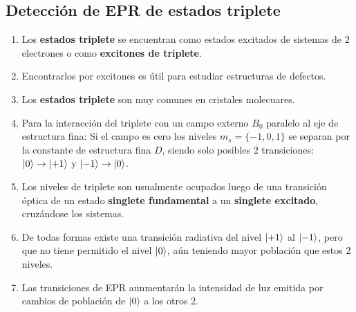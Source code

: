 \documentclass[aps,rmp,reprint,longbibliography]{revtex4-1}
\begin{document}
\subsection{Detección de EPR de estados triplete}
\begin{enumerate}
\item Los \textbf{estados triplete} se encuentran como estados excitados de sistemas de 2 electrones o como \textbf{excitones de triplete}. 
\item Encontrarlos por excitones es útil para estudiar estructuras de defectos. 
\item Los \textbf{estados triplete} son muy comunes en cristales molecuares. 
\item Para la interacción del triplete con un campo externo $B_0$ paralelo al eje de estructura fina: Si el campo es cero los niveles $m_s=\{-1,0,1\}$ se separan por la constante de estructura fina $D$, siendo solo posibles 2 transiciones: $\ket{0}\rightarrow\ket{+1}$ y $\ket{-1}\rightarrow\ket{0}$. 
\item Los niveles de triplete son usualmente ocupados luego de una transición óptica de un estado \textbf{singlete fundamental} a un \textbf{singlete excitado}, cruzándose los sistemas. 
\item De todas formas existe una transición radiativa del nivel $\ket{+1}$ al $\ket{-1}$, pero que no tiene permitido el nivel $\ket{0}$, aún teniendo mayor población que estos 2 niveles. 
\item Las transiciones de EPR aunmentarán la intensidad de luz emitida por cambios de población de $\ket{0}$ a los otros 2. 
\end{enumerate}
\end{document}
